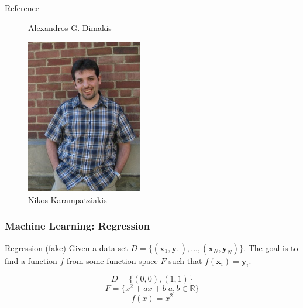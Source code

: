 \documentclass{beamer}
\begin{document}
\begin{frame}{Reference}
\begin{figure}
\begin{minipage}[t]{.2\paperwidth}
        \caption{Alexandros G. Dimakis}
    \end{minipage}
    \begin{minipage}[t]{.2\paperwidth}
        \centering
        \includegraphics[width=\textwidth]{res/Nikos Karampatziakis.jpg}
        \caption{Nikos Karampatziakis}
    \end{minipage}
\end{figure}

\end{frame}

\begin{frame}
    \frametitle{Machine Learning: Regression}

    \begin{block}{Regression (fake)}
        Given a data set $D = \{(\boldsymbol{x}_1, \boldsymbol{y}_1), \dots, (\boldsymbol{x}_N, \boldsymbol{y}_N)\}$. The goal is to find a function $f$ from some function space $F$ such that $f(\boldsymbol{x}_i) = \boldsymbol{y}_i$.
    \end{block}

    \begin{example}
        \[D = \{(0, 0), (1, 1)\}\]
        \[F = \{x^2 + ax + b \vert a, b \in \mathbb{R}\}\]
        \[f(x) = x^2\]
    \end{example}
\end{frame}
\end{document}
